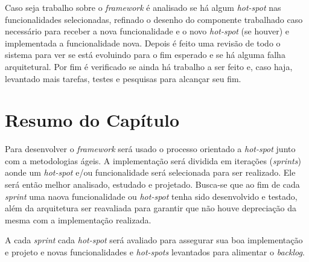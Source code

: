 Caso seja trabalho sobre o \textit{framework} é analisado se há algum \textit{hot-spot} nas funcionalidades selecionadas, refinado o desenho do componente trabalhado caso necessário para receber a nova funcionalidade e o novo \textit{hot-spot} (se houver) e implementada a funcionalidade nova. Depois é feito uma revisão de todo o sistema para ver se está evoluindo para o fim esperado e se há alguma falha arquitetural. Por fim é verificado se ainda há trabalho a ser feito e, caso haja, levantado mais tarefas, testes e pesquisas para alcançar seu fim.

\section{Resumo do Capítulo}

Para desenvolver o \textit{framework} será usado o processo orientado a \textit{hot-spot} junto com a metodologias ágeis. A implementação será dividida em iterações (\textit{sprints}) aonde um \textit{hot-spot} e/ou funcionalidade será selecionada para ser realizado. Ele será então melhor analisado, estudado e projetado. Busca-se que ao fim de cada \textit{sprint} uma naova funcionalidade ou \textit{hot-spot} tenha sido desenvolvido e testado, além da arquitetura ser reavaliada para garantir que não houve depreciação da mesma com a implementação realizada.

A cada \textit{sprint} cada \textit{hot-spot} será avaliado para assegurar sua boa implementação e projeto e novas funcionalidades e \textit{hot-spots} levantados para alimentar o \textit{backlog}.
